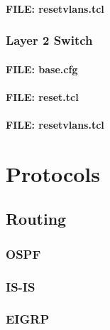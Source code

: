 \documentclass[a4paper,12pt,twoside]{book}
\begin{document}
\subsubsection{FILE: resetvlans.tcl}


\newpage


\subsection{Layer 2 Switch}
\subsubsection{FILE: base.cfg}

\subsubsection{FILE: reset.tcl}

\subsubsection{FILE: resetvlans.tcl}



\chapter{Protocols}

\section{Routing}

\subsection{OSPF}
\subsection{IS-IS}
\subsection{EIGRP}
\end{document}
